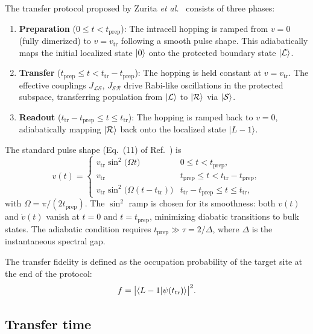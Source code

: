 \documentclass[
  reprint,
  amsmath,
  amssymb,
  aps,
  prb,
  longbibliography,
]{revtex4-2}
\newcommand{\ttr}{t_{\mathrm{tr}}}
\newcommand{\tprep}{t_{\mathrm{prep}}}
\newcommand{\JLS}{J_{\mathcal{LS}}}
\newcommand{\JSR}{J_{\mathcal{SR}}}
\newcommand{\ketL}{\ket{\mathcal{L}}}
\newcommand{\ketS}{\ket{\mathcal{S}}}
\newcommand{\ketR}{\ket{\mathcal{R}}}
\begin{document}
The transfer protocol proposed by Zurita \textit{et al.}~\cite{Zurita2023}
consists of three phases:
\begin{enumerate}
  \item \textbf{Preparation} ($0 \leq t < \tprep$): The intracell hopping
    is ramped from $v = 0$ (fully dimerized) to $v = v_{\mathrm{tr}}$
    following a smooth pulse shape. This adiabatically maps the initial
    localized state $\ket{0}$ onto the protected boundary state $\ketL$.
  \item \textbf{Transfer} ($\tprep \leq t < \ttr - \tprep$): The hopping
    is held constant at $v = v_{\mathrm{tr}}$. The effective couplings
    $\JLS$, $\JSR$ drive Rabi-like oscillations in the protected subspace,
    transferring population from $\ketL$ to $\ketR$ via $\ketS$.
  \item \textbf{Readout} ($\ttr - \tprep \leq t \leq \ttr$): The hopping
    is ramped back to $v = 0$, adiabatically mapping $\ketR$ back onto the
    localized state $\ket{L-1}$.
\end{enumerate}

The standard pulse shape (Eq.~(11) of Ref.~\cite{Zurita2023}) is
\begin{equation}
  v(t) =
  \begin{cases}
    v_{\mathrm{tr}} \sin^2\!\bigl(\Omega t\bigr) & 0 \leq t < \tprep, \\
    v_{\mathrm{tr}} & \tprep \leq t < \ttr - \tprep, \\
    v_{\mathrm{tr}} \sin^2\!\bigl(\Omega(t - \ttr)\bigr) & \ttr - \tprep \leq t \leq \ttr,
  \end{cases}
  \label{eq:pulse}
\end{equation}
with $\Omega = \pi/(2\tprep)$. The $\sin^2$ ramp is chosen for its smoothness:
both $v(t)$ and $\dot{v}(t)$ vanish at $t = 0$ and $t = \tprep$, minimizing
diabatic transitions to bulk states. The adiabatic condition requires
$\tprep \gg \tau = 2/\Delta$, where $\Delta$ is the instantaneous spectral gap.

The transfer fidelity is defined as the occupation probability of the target
site at the end of the protocol:
\begin{equation}
  f = \bigl|\braket{L-1|\psi(\ttr)}\bigr|^2.
  \label{eq:fidelity}
\end{equation}

\subsection{Transfer time}
\label{sec:transfer_time}
\end{document}
